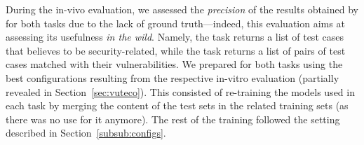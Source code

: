During the in-vivo evaluation, we assessed the \textit{precision} of the results obtained by \vuteco for both tasks due to the lack of ground truth---indeed, this evaluation aims at assessing its usefulness \textit{in the wild}.
Namely, the \finding task returns a list of test cases that \vuteco believes to be security-related, while the \matching task returns a list of pairs of test cases matched with their vulnerabilities.
%
We prepared \vuteco for both tasks using the best configurations resulting from the respective in-vitro evaluation (partially revealed in Section~\ref{sec:vuteco}).
This consisted of re-training the models used in each task by merging the content of the test sets in the related training sets (as there was no use for it anymore).
The rest of the training followed the setting described in Section~\ref{subsub:configs}.

